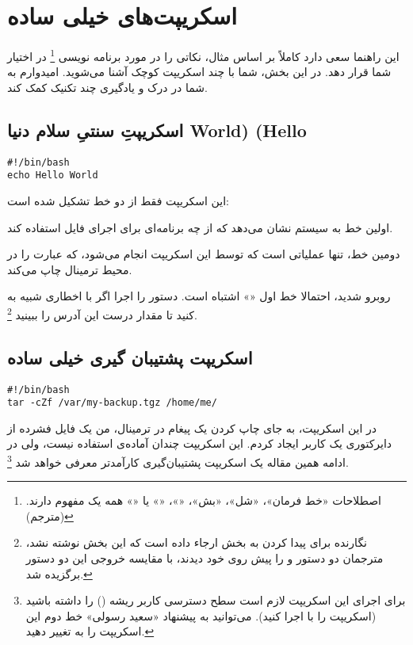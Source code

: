 \chapter{اسکریپت‌های خیلی ساده}
این راهنما سعی دارد کاملاً بر اساس مثال، نکاتی را در مورد برنامه نویسی
\footnote{
اصطلاحات «خط فرمان»، «شل»، «بش»، «»‏، «» یا «» همه یک
مفهوم دارند. (مترجم)
}
در اختیار شما قرار دهد. در این بخش، شما با چند اسکریپت‌ کوچک آشنا می‌شوید. امیدوارم
به شما در درک و یادگیری چند تکنیک کمک کند.


\section*{
اسکریپتِ سنتیِ سلام دنیا
World) (Hello
}

\begin{latin}
\begin{lstlisting}
#!/bin/bash
echo Hello World
\end{lstlisting}
\end{latin}

این اسکریپت فقط از دو خط تشکیل شده است:

اولین خط به سیستم نشان می‌دهد که از چه برنامه‌ای
برای اجرای فایل استفاده کند.

دومین خط، تنها عملیاتی است که توسط این اسکریپت انجام می‌شود، که عبارت 
را در محیط ترمینال چاپ می‌کند.

اگر با اخطاری شبیه به‎
روبرو شدید‌، احتمالا خط اول
«»
اشتباه است‌. دستور
 را اجرا کنید تا مقدار درست این آدرس را ببینید‌
\footnote{
نگارنده برای پیدا کردن  به بخش  ارجاء داده است که این بخش نوشته
نشد، مترجمان دو دستور
و
را پیش روی خود دیدند، با مقایسه
خروجی این دو دستور
برگزیده شد.
}.

\section*{اسکریپت پشتیبان گیری خیلی ساده}
\begin{latin}
\begin{lstlisting}
#!/bin/bash
tar -cZf /var/my-backup.tgz /home/me/
\end{lstlisting}
\end{latin}

در این اسکریپت، به جای چاپ کردن یک پیغام در ترمینال، من یک فایل فشرده
از دایرکتوری
یک کاربر ایجاد کردم. این اسکریپت چندان آماده‌ی استفاده نیست، ولی
در ادامه همین مقاله یک اسکریپت پشتیبان‌گیری کارآمدتر معرفی خواهد شد
\footnote{
برای اجرای این اسکریپت لازم است سطح دسترسی کاربر ریشه () را داشته باشید (اسکریپت
را با  اجرا کنید). می‌توانید به پیشنهاد «سعید رسولی» خط دوم این اسکریپت را به
تغییر دهید.
}.